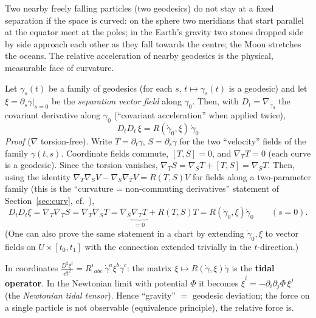 \begin{intuition}
Two nearby freely falling particles (two geodesics) do not stay at a fixed separation if the space is curved: on the sphere two meridians that start parallel at the equator meet at the poles; in the Earth's gravity two stones dropped side by side approach each other as they fall towards the centre; the Moon stretches the oceans. The relative acceleration of nearby geodesics is the physical, measurable face of curvature.
\end{intuition}

\begin{formal}
Let $\gamma_s(t)$ be a family of geodesics (for each $s$, $t\mapsto\gamma_s(t)$ is a geodesic) and let $\xi=\partial_s\gamma|_{s=0}$ be the \emph{separation vector field} along $\gamma_0$. Then, with $D_t=\nabla_{\dot\gamma_0}$ the covariant derivative along $\gamma_0$ (``covariant acceleration'' when applied twice),
\[
\boxed{\ D_tD_t\,\xi=R(\dot\gamma_0,\xi)\,\dot\gamma_0\ }
\]
\emph{Proof} ($\nabla$ torsion-free). Write $T=\partial_t\gamma$, $S=\partial_s\gamma$ for the two ``velocity'' fields of the family $\gamma(t,s)$. Coordinate fields commute, $[T,S]=0$, and $\nabla_TT=0$ (each curve is a geodesic). Since the torsion vanishes, $\nabla_TS=\nabla_ST+[T,S]=\nabla_ST$. Then, using the identity $\nabla_T\nabla_SV-\nabla_S\nabla_TV=R(T,S)V$ for fields along a two-parameter family (this is the ``curvature = non-commuting derivatives'' statement of Section~\ref{sec:curv}, cf.\ \cite[Prop.~7.5]{Lee}),
\[
D_tD_t\xi=\nabla_T\nabla_TS=\nabla_T\nabla_ST=\nabla_S\underbrace{\nabla_TT}_{=0}+R(T,S)T=R(\dot\gamma_0,\xi)\dot\gamma_0\qquad(s=0).
\]
(One can also prove the same statement in a chart by extending $\dot\gamma_0,\xi$ to vector fields on $U\times[t_0,t_1]$ with the connection extended trivially in the $t$-direction.)
\end{formal}
\begin{intuition}[{curvature = tidal tensor}]
In coordinates $\frac{D^2\xi^i}{\dd t^2}=R^i{}_{abc}\ \dot\gamma^a\xi^b\dot\gamma^c$: the matrix $\xi\mapsto R(\dot\gamma,\xi)\dot\gamma$ is the \textbf{tidal operator}. In the Newtonian limit with potential $\Phi$ it becomes $\ddot\xi^i=-\partial_i\partial_j\Phi\,\xi^j$ (the \emph{Newtonian tidal tensor}). Hence ``gravity'' $=$ geodesic deviation; the force on a single particle is not observable (equivalence principle), the relative force is.
\end{intuition}

